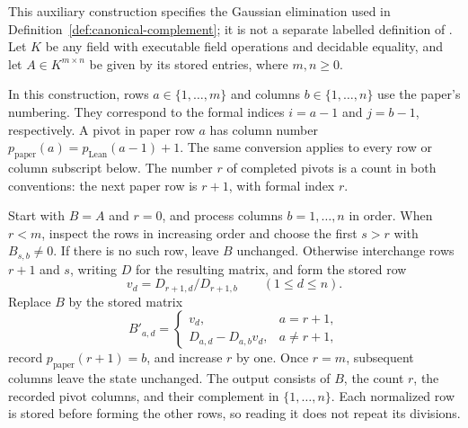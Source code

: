 \begin{definition}\label{def:gaussian-elimination}
  \leanok
  This auxiliary construction specifies the Gaussian elimination used in
  Definition~\ref{def:canonical-complement}; it is not a separate labelled
  definition of \cite{Ji2020MIPStar}. Let $K$ be any field with executable
  field operations and decidable equality, and let $A\in K^{m\times n}$ be
  given by its stored entries, where $m,n\geq 0$.

  In this construction, rows $a\in\{1,\ldots,m\}$ and columns
  $b\in\{1,\ldots,n\}$ use the paper's numbering. They correspond to the
  formal indices $i=a-1$ and $j=b-1$, respectively. A pivot in paper row
  $a$ has column number
  $p_{\mathrm{paper}}(a)=p_{\mathrm{Lean}}(a-1)+1$.
  The same conversion applies to every row or column subscript below.
  The number $r$ of completed pivots is a count in both conventions:
  the next paper row is $r+1$, with formal index $r$.

  Start with $B=A$ and $r=0$, and process columns $b=1,\ldots,n$ in order.
  When $r<m$, inspect the rows in increasing order and choose the first
  $s>r$ with $B_{s,b}\ne 0$. If there is no such row, leave $B$ unchanged.
  Otherwise interchange rows $r+1$ and $s$, writing $D$ for the resulting
  matrix, and form the stored row
  \[
    v_d=D_{r+1,d}/D_{r+1,b}\qquad(1\leq d\leq n).
  \]
  Replace $B$ by the stored matrix
  \[
    B'_{a,d}=\begin{cases}
      v_d,&a=r+1,\\
      D_{a,d}-D_{a,b}v_d,&a\ne r+1,
    \end{cases}
  \]
  record $p_{\mathrm{paper}}(r+1)=b$, and increase $r$ by one.
  Once $r=m$, subsequent columns leave the state unchanged. The output
  consists of $B$, the count $r$, the recorded pivot columns, and their
  complement in $\{1,\ldots,n\}$. Each normalized row is stored before
  forming the other rows, so reading it does not repeat its divisions.
\end{definition}

